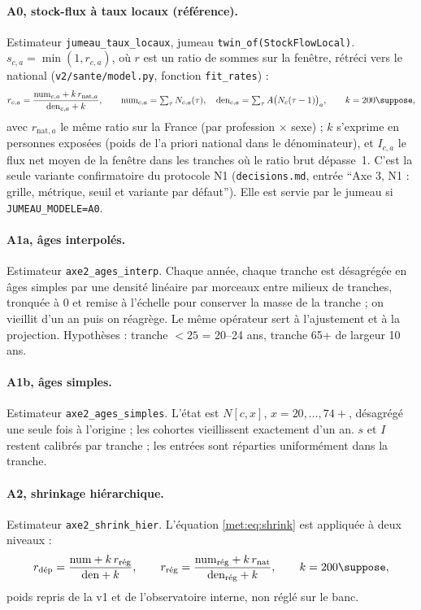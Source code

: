 \paragraph{A0, stock-flux à taux locaux (référence).} Estimateur \texttt{jumeau\_taux\_locaux}, jumeau
\texttt{twin\_of(StockFlowLocal)}. $s_{c,a} = \min(1, r_{c,a})$, où $r$ est un ratio de sommes sur la
fenêtre, rétréci vers le national (\texttt{v2/sante/model.py}, fonction \texttt{fit\_rates}) :
\begin{equation}
  r_{c,a} = \frac{\text{num}_{c,a} + k\, r_{\text{nat},a}}{\text{den}_{c,a} + k}, \qquad
  \text{num}_{c,a} = \textstyle\sum_\tau N_{c,a}(\tau), \quad
  \text{den}_{c,a} = \textstyle\sum_\tau A\big(N_c(\tau-1)\big)_a, \qquad k = 200\suppose,
  \label{met:eq:shrink}
\end{equation}
avec $r_{\text{nat},a}$ le même ratio sur la France (par profession $\times$ sexe) ; $k$ s'exprime en
personnes exposées (poids de l'a priori national dans le dénominateur),
et $I_{c,a}$ le flux net moyen de la fenêtre dans les tranches où le ratio brut dépasse~1. C'est la seule
variante confirmatoire du protocole N1 (\texttt{decisions.md}, entrée \enquote{Axe 3, N1 : grille,
métrique, seuil et variante par défaut}). Elle est servie par le jumeau si \texttt{JUMEAU\_MODELE=A0}.

\paragraph{A1a, âges interpolés.} Estimateur \texttt{axe2\_ages\_interp}. Chaque année, chaque tranche est
désagrégée en âges simples par une densité linéaire par morceaux entre milieux de tranches, tronquée à 0 et
remise à l'échelle pour conserver la masse de la tranche ; on vieillit d'un an puis on réagrège. Le même
opérateur sert à l'ajustement et à la projection. Hypothèses : tranche $<25$ = 20--24 ans\suppose{},
tranche 65+ de largeur 10 ans\suppose.

\paragraph{A1b, âges simples.} Estimateur \texttt{axe2\_ages\_simples}. L'état est
$N[c, x]$, $x = 20, \dots, 74+$, désagrégé une seule fois à l'origine ; les cohortes vieillissent
exactement d'un an. $s$ et $I$ restent calibrés par tranche ; les entrées sont réparties uniformément dans
la tranche\suppose.

\paragraph{A2, shrinkage hiérarchique.} Estimateur \texttt{axe2\_shrink\_hier}. L'équation
\eqref{met:eq:shrink} est appliquée à deux niveaux :
\begin{equation}
  r_{\text{dép}} = \frac{\text{num} + k\, r_{\text{rég}}}{\text{den} + k}, \qquad
  r_{\text{rég}} = \frac{\text{num}_{\text{rég}} + k\, r_{\text{nat}}}{\text{den}_{\text{rég}} + k},
  \qquad k = 200\suppose,
\end{equation}
poids repris de la v1 et de l'observatoire interne, non réglé sur le banc.

